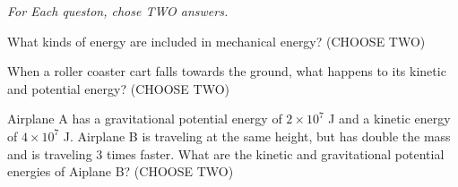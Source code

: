 \documentclass[11pt]{examdesign}
\begin{document}
\begin{multiplechoice} [title={Multiple Corect Multiple Choice},
	rearrange=no]

\textit{For Each queston, chose TWO answers. }
	


\begin{question}
	What kinds of energy are included in mechanical energy? (CHOOSE TWO)
\end{question}

\begin{question}
When a roller coaster cart falls towards the ground, what happens to its kinetic and potential energy? (CHOOSE TWO)
\end{question}

\begin{question}
Airplane A has a gravitational potential energy of $2 \times 10^7$ J and a kinetic energy of $4 \times 10^7$ J.  Airplane B is traveling at the same height, but has double the mass and is traveling 3 times faster.  What are the kinetic and gravitational potential energies of Aiplane B? (CHOOSE TWO)

\end{question}


\end{multiplechoice} 
\pagebreak
\end{document}
